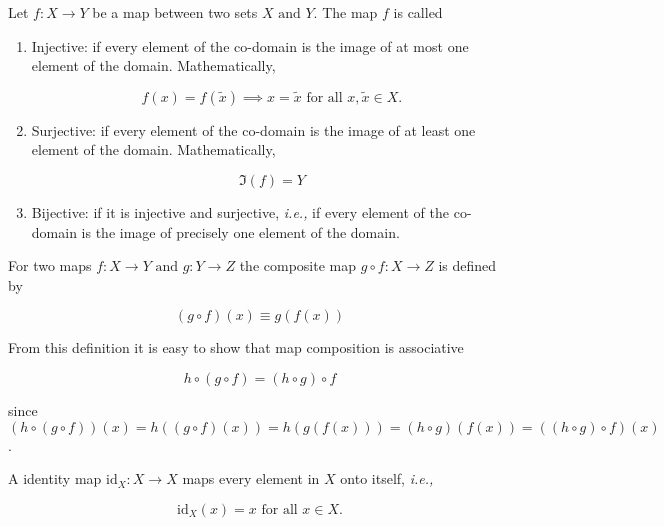 \documentclass[a4paper,12pt]{report}
\begin{document}
\begin{definition}
Let \(f:X \rightarrow Y\) be a map between two sets \(X \text { and } Y\). The map \(f\) is called

\begin{enumerate}
    \item Injective: if every element of the co-domain is the image of at most one element of the domain. Mathematically,
    
    \begin{equation}
        f(x) = f(\tilde{x} ) \implies x = \tilde{x} \text{ for all } x,\tilde{x} \in X.
    \end{equation}

    \item Surjective: if every element of the co-domain is the image of at least one element of the domain. Mathematically,
    
    \begin{equation}
        \Im (f) = Y
    \end{equation}
    
    \item Bijective: if it is injective and surjective, \textit{i.e.,} if every element of the co-domain is the image of precisely one element of the domain.
   
\end{enumerate}

\end{definition}

\begin{definition}
For two maps \(f:X \rightarrow Y \text { and } g: Y \rightarrow Z\) the composite map  \(g \circ f: X \rightarrow Z\) is defined by

\begin{equation}
    (g \circ f)(x) \equiv g(f(x))
\end{equation}

\end{definition}

From this definition it is easy to show that map composition is associative

\begin{equation}
    h \circ (g \circ  f) = (h \circ  g) \circ f
\end{equation}

since \((h \circ (g \circ f))(x) = h((g \circ f)(x)) = h(g(f(x))) = (h \circ g)(f(x)) = ((h \circ g) \circ f)(x)\).

\begin{definition}
A identity map \(\mathrm{id}_{X} : X \rightarrow X\)  maps every element in \(X\) onto itself, \textit{i.e.,} 

\begin{equation}
    \mathrm{id}_{X} (x) = x \text{ for all } x \in  X.
\end{equation}
\end{definition}
\end{document}
